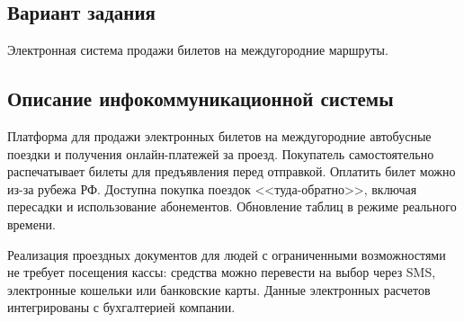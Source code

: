 \subsection*{Вариант задания}

Электронная система продажи билетов на междугородние маршруты.

\subsection*{Описание инфокоммуникационной системы}

Платформа для продажи электронных билетов на междугородние автобусные поездки и
получения онлайн-платежей за проезд. Покупатель самостоятельно распечатывает
билеты для предъявления перед отправкой. Оплатить билет можно из-за рубежа РФ.
Доступна покупка поездок <<туда-обратно>>, включая пересадки и использование
абонементов. Обновление таблиц в режиме реального времени.

Реализация проездных документов для людей с ограниченными возможностями не
требует посещения кассы: средства можно перевести на выбор через SMS,
электронные кошельки или банковские карты. Данные электронных расчетов
интегрированы с бухгалтерией компании.
